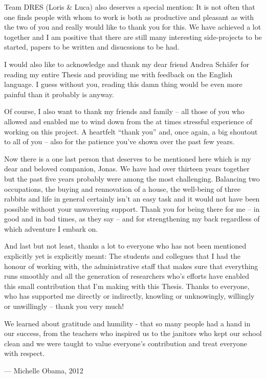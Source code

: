 Team DRES (Loris \& Luca) also deserves a special mention: It is not often that one finds people with whom to work is both as productive and pleasant as with the two of you and really would like to thank you for this. We have achieved a lot together and I am positive that there are still many interesting side-projects to be started, papers to be written and disucssions to be had.

I would also like to acknowledge and thank my dear friend Andrea Schäfer for reading my entire Thesis and providing me with feedback on the English language. I guess without you, reading this damn thing would be even more painful than it probably is anyway.

Of course, I also want to thank my friends and family -- all those of you who allowed and enabled me to wind down from the at times stressful experience of working on this project. A heartfelt ``thank you'' and, once again, a big shoutout to all of you -- also for the patience you've shown over the past few years.

Now there is a one last person that deserves to be mentioned here which is my dear and beloved companion, Jonas. We have had over thirteen years together but the past five years probably were among the most challenging. Balancing two occupations, the buying and rennovation of a house, the well-being of three rabbits and life in general certainly isn't an easy task and it would not have been possible without your unwavering support. Thank you for being there for me -- in good and in bad times, as they say -- and for strengthening my back regardless of which adventure I embark on.

And last but not least, thanks a lot to everyone who has not been mentioned explicitly yet is explicitly meant: The students and collegues that I had the honour of working with, the administrative staff that makes sure that everything runs smoothly and all the generation of researchers who's efforts have enabled this small contribution that I'm making with this Thesis. Thanks to everyone, who has supported me directly or indirectly, knowling or unknowingly, willingly or unwillingly -- thank you very much!

\epigraph{We learned about gratitude and humility - that so many people had a hand in our success, from the teachers who inspired us to the janitors who kept our school clean and we were taught to value everyone's contribution and treat everyone with respect.}{--- \textup{Michelle Obama}, 2012}


\cleardoublepage
